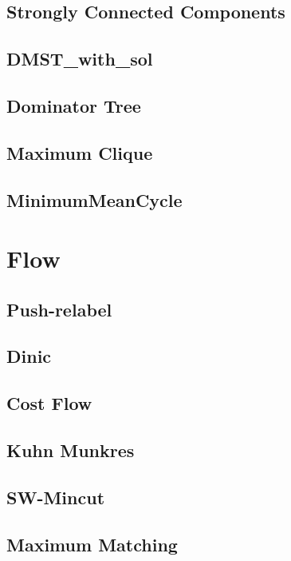 \documentclass[a4paper,10pt,twocolumn,oneside]{article}
\begin{document}
\subsection{Strongly Connected Components}

\subsection{DMST\_with\_sol}

\subsection{Dominator Tree}

\subsection{Maximum Clique}

\subsection{MinimumMeanCycle}


\section{Flow}
\subsection{Push-relabel} %

\subsection{Dinic} %

\subsection{Cost Flow} %

\subsection{Kuhn Munkres}

\subsection{SW-Mincut}

\subsection{Maximum Matching}

\end{document}
